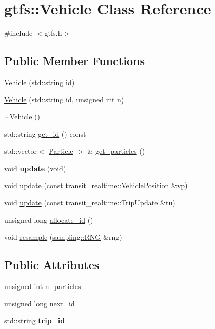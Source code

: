 \hypertarget{classgtfs_1_1Vehicle}{}\section{gtfs\+:\+:Vehicle Class Reference}
\label{classgtfs_1_1Vehicle}


{\ttfamily \#include $<$gtfs.\+h$>$}

\subsection*{Public Member Functions}
\begin{DoxyCompactItemize}
\item 
\hyperlink{classgtfs_1_1Vehicle_ac3f8111a611378f5f8b29f7465e48919}{Vehicle} (std\+::string id)
\item 
\hyperlink{classgtfs_1_1Vehicle_adf892e71483b7f9005846599fd0308e6}{Vehicle} (std\+::string id, unsigned int n)
\item 
\hyperlink{classgtfs_1_1Vehicle_a08c7450dd0df9406f78b30be044d27d8}{$\sim$\+Vehicle} ()
\item 
std\+::string \hyperlink{classgtfs_1_1Vehicle_a6b388986c9ed4af1eb86f13a3d2de8e0}{get\+\_\+id} () const
\item 
std\+::vector$<$ \hyperlink{classgtfs_1_1Particle}{Particle} $>$ \& \hyperlink{classgtfs_1_1Vehicle_a7b12b079c68880f00f532ca25858c368}{get\+\_\+particles} ()
\item 
\mbox{\label{classgtfs_1_1Vehicle_aab490aeda8084cfcb8de29f0aedaa416}} 
void {\bfseries update} (void)
\item 
void \hyperlink{classgtfs_1_1Vehicle_a50ae70c92d958437a2196b0ce81acff0}{update} (const transit\+\_\+realtime\+::\+Vehicle\+Position \&vp)
\item 
void \hyperlink{classgtfs_1_1Vehicle_a4cc25a17473bf7bccc39b37ef5d7c956}{update} (const transit\+\_\+realtime\+::\+Trip\+Update \&tu)
\item 
unsigned long \hyperlink{classgtfs_1_1Vehicle_aa9087e973a9821f384ec47f51bdcedc7}{allocate\+\_\+id} ()
\item 
void \hyperlink{classgtfs_1_1Vehicle_a8367fc70a64b7e596422f880dbff1193}{resample} (\hyperlink{classsampling_1_1RNG}{sampling\+::\+R\+NG} \&rng)
\end{DoxyCompactItemize}
\subsection*{Public Attributes}
\begin{DoxyCompactItemize}
\item 
unsigned int \hyperlink{classgtfs_1_1Vehicle_aa21babc8423abf92bbdf5e0748444f44}{n\+\_\+particles}
\item 
unsigned long \hyperlink{classgtfs_1_1Vehicle_aab535dd9953f9650e2adc351965779b1}{next\+\_\+id}
\item 
\mbox{\label{classgtfs_1_1Vehicle_a5b3e2ea332b8433000f0cbff13a45255}} 
std\+::string {\bfseries trip\+\_\+id}
\end{DoxyCompactItemize}


